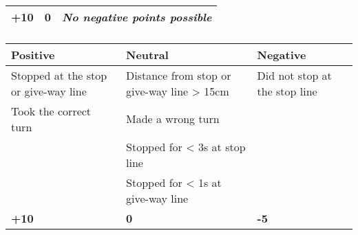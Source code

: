 {\begin{table}[H]
\begin{tabularx}{\textwidth}{XXX}
			\topstrut
			\textbf{+10}                           & \textbf{0}                         & \textit{No negative points possible} \\
			\bottomrule
		\end{tabularx}
	\end{table}

	\subsubsection*{}
	\begin{table}[H]
		\begin{tabularx}{\textwidth}{XXX}
			\toprule
			\textbf{Positive}                    & \textbf{Neutral}                           & \textbf{Negative}                              \\
			\midrule
			Stopped at the stop or give-way line & Distance from stop or give-way line > 15cm & Did not stop at the stop line \footnotemark[1] \\
			Took the correct turn                & Made a wrong turn \footnotemark[2]         &                                                \\
			                                     & Stopped for < 3s at stop line              &                                                \\
			                                     & Stopped for < 1s at give-way line          &                                                \\
			\topstrut
			\textbf{+10}                         & \textbf{0}                                 & \textbf{-5}                                    \\
			\bottomrule
		\end{tabularx}
	\end{table}

	\newpage


}
